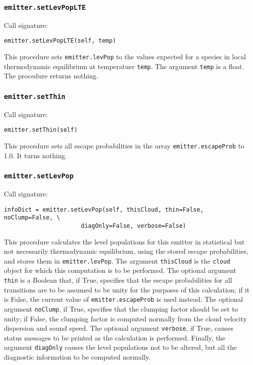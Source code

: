 \documentclass[12pt]{article}
\begin{document}
\subsubsection{\texttt{emitter.setLevPopLTE}}

Call signature:

\begin{verbatim}
emitter.setLevPopLTE(self, temp)
\end{verbatim}

This procedure sets \verb=emitter.levPop= to the values expected for a species in local thermodynamic equilibrium at temperature \verb=temp=. The argument \verb=temp= is a float. The procedure returns nothing.

\subsubsection{\texttt{emitter.setThin}}

Call signature:

\begin{verbatim}
emitter.setThin(self)
\end{verbatim}

This procedure sets all escape probabilities in the array \verb=emitter.escapeProb= to 1.0. It turns nothing.

\subsubsection{\texttt{emitter.setLevPop}}

Call signature:

\begin{verbatim}
infoDict = emitter.setLevPop(self, thisCloud, thin=False, noClump=False, \
                      diagOnly=False, verbose=False)
\end{verbatim}

This procedure calculates the level populations for this emitter in statistical but not necessarily thermodynamic equilibrium, using the stored escape probabilities, and stores them in \verb=emitter.levPop=. The argument \verb=thisCloud= is the \verb=cloud= object for which this computation is to be performed. The optional argument \verb=thin= is a Boolean that, if True, specifies that the escape probabilities for all transitions are to be assumed to be unity for the purposes of this calculation; if it is False, the current value of \verb=emitter.escapeProb= is used instead. The optional argument \verb=noClump=, if True, specifies that the clumping factor should be set to unity; if False, the clumping factor is computed normally from the cloud velocity dispersion and sound speed. The optional argument \verb=verbose=, if True, causes status messages to be printed as the calculation is performed. Finally, the argument \verb=diagOnly= causes the level populations not to be altered, but all the diagnostic information to be computed normally.
\end{document}
